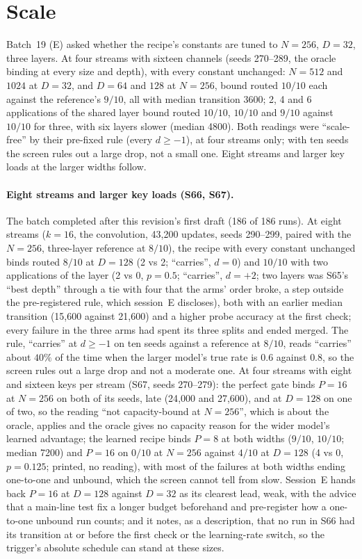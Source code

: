 \documentclass[11pt]{article}
\begin{document}
\section{Scale}
\label{sec:scale}

Batch~19 (E) asked whether the recipe's constants are tuned to $N = 256$, $D = 32$, three layers. At four streams with sixteen channels (seeds 270--289, the oracle binding at every size and depth), with every constant unchanged: $N = 512$ and $1024$ at $D = 32$, and $D = 64$ and $128$ at $N = 256$, bound routed $10/10$ each against the reference's $9/10$, all with median transition 3600; 2, 4 and 6 applications of the shared layer bound routed $10/10$, $10/10$ and $9/10$ against $10/10$ for three, with six layers slower (median 4800). Both readings were ``scale-free'' by their pre-fixed rule (every $d \geq -1$), at four streams only; with ten seeds the screen rules out a large drop, not a small one. Eight streams and larger key loads at the larger widths follow.

\paragraph{Eight streams and larger key loads (S66, S67).} The batch completed after this revision's first draft (186 of 186 runs). At eight streams ($k = 16$, the convolution, 43{,}200 updates, seeds 290--299, paired with the $N = 256$, three-layer reference at $8/10$), the recipe with every constant unchanged binds routed $8/10$ at $D = 128$ (2 vs 2; ``carries'', $d = 0$) and $10/10$ with two applications of the layer (2 vs 0, $p = 0.5$; ``carries'', $d = +2$; two layers was S65's ``best depth'' through a tie with four that the arms' order broke, a step outside the pre-registered rule, which session~E discloses), both with an earlier median transition (15{,}600 against 21{,}600) and a higher probe accuracy at the first check; every failure in the three arms had spent its three splits and ended merged. The rule, ``carries'' at $d \geq -1$ on ten seeds against a reference at $8/10$, reads ``carries'' about $40\%$ of the time when the larger model's true rate is $0.6$ against $0.8$, so the screen rules out a large drop and not a moderate one. At four streams with eight and sixteen keys per stream (S67, seeds 270--279): the perfect gate binds $P = 16$ at $N = 256$ on both of its seeds, late (24{,}000 and 27{,}600), and at $D = 128$ on one of two, so the reading ``not capacity-bound at $N = 256$'', which is about the oracle, applies and the oracle gives no capacity reason for the wider model's learned advantage; the learned recipe binds $P = 8$ at both widths ($9/10$, $10/10$; median 7200) and $P = 16$ on $0/10$ at $N = 256$ against $4/10$ at $D = 128$ (4 vs 0, $p = 0.125$; printed, no reading), with most of the failures at both widths ending one-to-one and unbound, which the screen cannot tell from slow. Session~E hands back $P = 16$ at $D = 128$ against $D = 32$ as its clearest lead, weak, with the advice that a main-line test fix a longer budget beforehand and pre-register how a one-to-one unbound run counts; and it notes, as a description, that no run in S66 had its transition at or before the first check or the learning-rate switch, so the trigger's absolute schedule can stand at these sizes.
\end{document}
